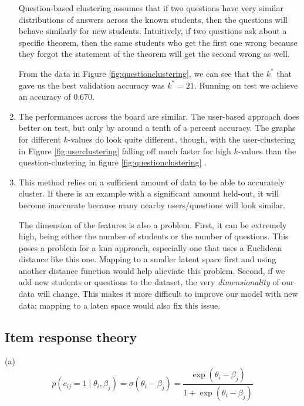 \documentclass[twocolumn]{article}
\begin{document}
\begin{enumerate}
Question-based clustering assumes that if two questions have very similar
distributions of answers across the known students, then the questions will
behave similarly for new students. Intuitively, if two questions ask about a
specific theorem, then the same students who get the first one wrong because
they forgot the statement of the theorem will get the second wrong as well.

From the data in Figure \ref{fig:questionclustering}, we can see that the $k^*$ that gave us the best validation
accuracy was $k^* = 21$. Running on test we achieve an accuracy of $0.670$.

\item
The performances across the board are similar. The user-based approach does
better on test, but only by around a tenth of a percent accuracy. The graphs
for different $k$-values do look quite different, though, with the
user-clustering in Figure \ref{fig:userclustering} falling off much faster for
high $k$-values than the question-clustering in figure
\ref{fig:questionclustering} .

\item

This method relies on a sufficient amount of data to be able to accurately
cluster. If there is an example with a significant amount held-out, it will
become inaccurate because many nearby users/questions will look similar.

The dimension of the features is also a problem. First, it can be extremely
high, being either the number of students or the number of questions. This
poses a problem for a {\sc knn} approach, especially one that uses a Euclidean
distance like this one. Mapping to a smaller latent space first and using
another distance function would help alieviate this problem. Second, if we add
new students or questions to the dataset, the very {\it dimensionality} of our
data will change. This makes it more difficult to improve our model with new
data; mapping to a laten space would also fix this issue.

\end{enumerate}

\subsection{Item response theory}
\item 
(a) 
\[
p(c_{ij} = 1 \mid \theta_i, \beta_j)
= \sigma(\theta_i - \beta_j)
= \frac{\exp(\theta_i - \beta_j)}{1 + \exp(\theta_i - \beta_j)}
\]
\end{document}
